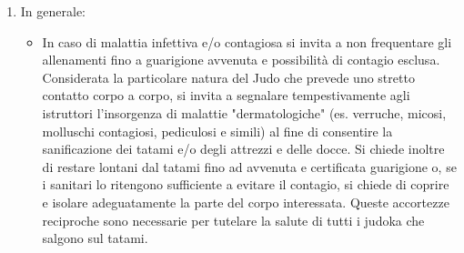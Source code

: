 \documentclass{djtsdoc}
\begin{document}
\begin{enumerate}
\begin{enumerate}
\begin{itemize}
			\end{itemize}
			\item In generale:
			\begin{itemize}
				\item In caso di malattia infettiva e/o contagiosa si invita a non frequentare gli allenamenti fino a guarigione avvenuta e possibilità di contagio esclusa. Considerata la particolare natura del Judo che prevede uno stretto contatto corpo a corpo, si invita a segnalare tempestivamente agli istruttori l'insorgenza di malattie "dermatologiche" (es. verruche, micosi, molluschi contagiosi, pediculosi e simili) al fine di consentire la sanificazione dei tatami e/o degli attrezzi e delle docce. Si chiede inoltre di restare lontani dal tatami fino ad avvenuta e certificata guarigione o, se i sanitari lo ritengono sufficiente a evitare il contagio, si chiede di coprire e isolare adeguatamente la parte del corpo interessata. Queste accortezze reciproche sono necessarie per tutelare la salute di tutti i judoka che salgono sul tatami.
			\end{itemize}
		\end{enumerate}
	\end{enumerate}
	
\end{document}
